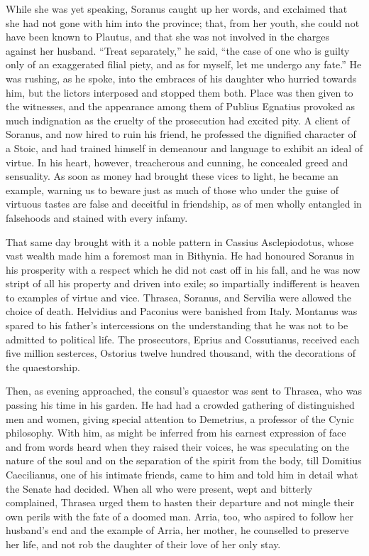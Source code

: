 While she was yet speaking, Soranus caught up her words, and exclaimed that she had not gone with him into the province; that, from her youth, she could not have been known to Plautus, and that she was not involved in the charges against her husband. ``Treat separately,'' he said, ``the case of one who is guilty only of an exaggerated filial piety, and as for myself, let me undergo any fate.'' He was rushing, as he spoke, into the embraces of his daughter who hurried towards him, but the lictors interposed and stopped them both. Place was then given to the witnesses, and the appearance among them of Publius Egnatius provoked as much indignation as the cruelty of the prosecution had excited pity. A client of Soranus, and now hired to ruin his friend, he professed the dignified character of a Stoic, and had trained himself in demeanour and language to exhibit an ideal of virtue. In his heart, however, treacherous and cunning, he concealed greed and sensuality. As soon as money had brought these vices to light, he became an example, warning us to beware just as much of those who under the guise of virtuous tastes are false and deceitful in friendship, as of men wholly entangled in falsehoods and stained with every infamy.


That same day brought with it a noble pattern in Cassius Asclepiodotus, whose vast wealth made him a foremost man in Bithynia. He had honoured Soranus in his prosperity with a respect which he did not cast off in his fall, and he was now stript of all his property and driven into exile; so impartially indifferent is heaven to examples of virtue and vice. Thrasea, Soranus, and Servilia were allowed the choice of death. Helvidius and Paconius were banished from Italy. Montanus was spared to his father's intercessions on the understanding that he was not to be admitted to political life. The prosecutors, Eprius and Cossutianus, received each five million sesterces, Ostorius twelve hundred thousand, with the decorations of the quaestorship.


Then, as evening approached, the consul's quaestor was sent to Thrasea, who was passing his time in his garden. He had had a crowded gathering of distinguished men and women, giving special attention to Demetrius, a professor of the Cynic philosophy. With him, as might be inferred from his earnest expression of face and from words heard when they raised their voices, he was speculating on the nature of the soul and on the separation of the spirit from the body, till Domitius Caecilianus, one of his intimate friends, came to him and told him in detail what the Senate had decided. When all who were present, wept and bitterly complained, Thrasea urged them to hasten their departure and not mingle their own perils with the fate of a doomed man. Arria, too, who aspired to follow her husband's end and the example of Arria, her mother, he counselled to preserve her life, and not rob the daughter of their love of her only stay.

